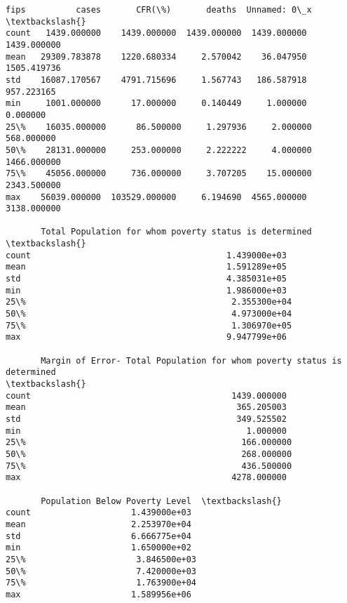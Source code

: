 \documentclass[11pt]{article}
\makeatletter
\newcommand{\boxspacing}{\kern\kvtcb@left@rule\kern\kvtcb@boxsep}
\newcommand{\prompt}[4]{
        \ttfamily\llap{{\color{#2}[#3]:\hspace{3pt}#4}}\vspace{-\baselineskip}
    }
\makeatother
\begin{document}
            \begin{tcolorbox}[breakable, size=fbox, boxrule=.5pt, pad at break*=1mm, opacityfill=0]
\prompt{Out}{outcolor}{59}{\boxspacing}
\begin{Verbatim}[commandchars=\\\{\}]
               fips          cases       CFR(\%)       deaths  Unnamed: 0\_x  \textbackslash{}
count   1439.000000    1439.000000  1439.000000  1439.000000   1439.000000
mean   29309.783878    1220.680334     2.570042    36.047950   1505.419736
std    16087.170567    4791.715696     1.567743   186.587918    957.223165
min     1001.000000      17.000000     0.140449     1.000000      0.000000
25\%    16035.000000      86.500000     1.297936     2.000000    568.000000
50\%    28131.000000     253.000000     2.222222     4.000000   1466.000000
75\%    45056.000000     736.000000     3.707205    15.000000   2343.500000
max    56039.000000  103529.000000     6.194690  4565.000000   3138.000000

       Total Population for whom poverty status is determined  \textbackslash{}
count                                       1.439000e+03
mean                                        1.591289e+05
std                                         4.385031e+05
min                                         1.986000e+03
25\%                                         2.355300e+04
50\%                                         4.973000e+04
75\%                                         1.306970e+05
max                                         9.947799e+06

       Margin of Error- Total Population for whom poverty status is determined
\textbackslash{}
count                                        1439.000000
mean                                          365.205003
std                                           349.525502
min                                             1.000000
25\%                                           166.000000
50\%                                           268.000000
75\%                                           436.500000
max                                          4278.000000

       Population Below Poverty Level  \textbackslash{}
count                    1.439000e+03
mean                     2.253970e+04
std                      6.666775e+04
min                      1.650000e+02
25\%                      3.846500e+03
50\%                      7.420000e+03
75\%                      1.763900e+04
max                      1.589956e+06


\end{Verbatim}
\end{tcolorbox}
\end{document}
